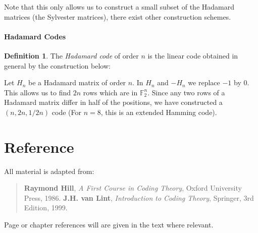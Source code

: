 \documentclass[11pt,a4paper]{article}
\theoremstyle{definition}
\newtheorem{definition}{Definition}[section]
\theoremstyle{plain}
\theoremstyle{remark}
\begin{document}
Note that this only allows us to construct a small subset of the Hadamard matrices (the Sylvester matrices), there exist other construction schemes.

\paragraph{Hadamard Codes} 
\begin{definition}
    The \emph{Hadamard code} of order $n$ is the linear code obtained in general by the construction below:
    
    Let $H_n$ be a Hadamard matrix of order $n$. In $H_n$ and $- H_n$ we replace $-1$ by $0$. 
    This allows us to find $2n$ rows which are in $\mathbb{F}_2^n$. Since any two rows of a Hadamard matrix differ in half of the positions, 
    we have constructed a $(n, 2n, 1/2 n)$ code (For $n = 8$, this is an extended Hamming code). 
\end{definition}



\section{Reference}
All material is adapted from: 
\begin{quote}
    \textbf{Raymond Hill}, \emph{A First Course in Coding Theory}, Oxford University Press, 1986.
    \textbf{J.H. van Lint}, \emph{Introduction to Coding Theory}, Springer, 3rd Edition, 1999.
\end{quote}
Page or chapter references will are given in the text where relevant. 
\end{document}
